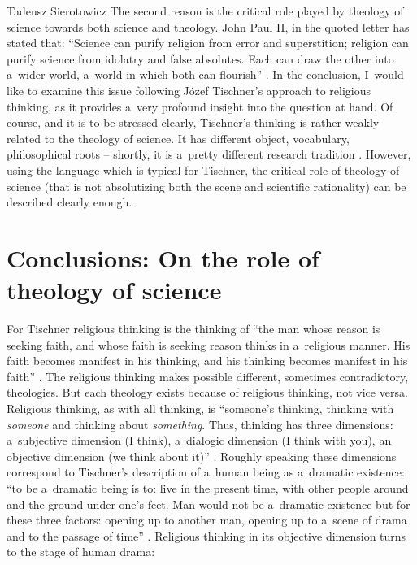 \begin{artengenv}{Tadeusz Sierotowicz}
The second reason is the critical role played by theology of science towards both science and theology. John Paul II, in the quoted letter has stated that: ``Science can purify religion from error and superstition; religion can purify science from idolatry and false absolutes. Each can draw the other into a~wider world, a~world in which both can flourish'' 
\parencite[][]{john_paul_ii_letter_1988}. %
 In the conclusion, I~would like to examine this issue following Józef Tischner's approach to religious thinking, as it provides a~very profound insight into the question at hand. Of course, and it is to be stressed clearly, Tischner's thinking is rather weakly related to the theology of science. It has different object, vocabulary, philosophical roots -- shortly, it is a~pretty different research tradition 
\parencite[][]{sierotowicz_filozofia_2018}. %
 However, using the language which is typical for Tischner, the critical role of theology of science (that is not absolutizing both the scene and scientific rationality) can be described clearly enough.



\section{Conclusions: On the role of theology of science}

For Tischner religious thinking is the thinking of ``the man whose reason is seeking faith, and whose faith is seeking reason thinks in a~religious manner. His faith becomes manifest in his thinking, and his thinking becomes manifest in his faith'' 
\parencite[][p.221]{jagiello_jozef_2020}. %
 The religious thinking makes possible different, sometimes contradictory, theologies. But each theology exists because of religious thinking, not vice versa. Religious thinking, as with all thinking, is ``someone's thinking, thinking with \textit{someone} and thinking about \textit{something}. Thus, thinking has three dimensions: a~subjective dimension (I think), a~dialogic dimension (I think with you), an objective dimension (we think about it)'' 
\parencite[][p.224]{jagiello_jozef_2020}. %
 Roughly speaking these dimensions correspond to Tischner's description of a~human being as a~dramatic existence: ``to be a~dramatic being is to: live in the present time, with other people around and the ground under one's feet. Man would not be a~dramatic existence but for these three factors: opening up to another man, opening up to a~scene of drama and to the passage of time'' 
\parencite[][p.165]{jagiello_jozef_2020}. %
 Religious thinking in its objective dimension turns to the stage of human drama:




\end{artengenv}
